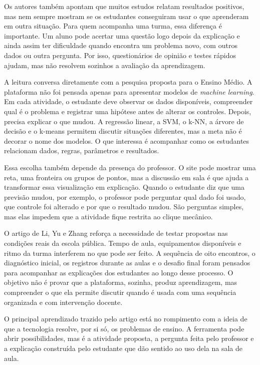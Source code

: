 \documentclass[12pt,a4paper]{article}
\begin{document}
Os autores também apontam que muitos estudos relatam resultados positivos, mas nem sempre mostram se os estudantes conseguiram usar o que aprenderam em outra situação. Para quem acompanha uma turma, essa diferença é importante. Um aluno pode acertar uma questão logo depois da explicação e ainda assim ter dificuldade quando encontra um problema novo, com outros dados ou outra pergunta. Por isso, questionários de opinião e testes rápidos ajudam, mas não resolvem sozinhos a avaliação da aprendizagem.

A leitura conversa diretamente com a pesquisa proposta para o Ensino Médio. A plataforma não foi pensada apenas para apresentar modelos de \textit{machine learning}. Em cada atividade, o estudante deve observar os dados disponíveis, compreender qual é o problema e registrar uma hipótese antes de alterar os controles. Depois, precisa explicar o que mudou. A regressão linear, a SVM, o k-NN, a árvore de decisão e o k-means permitem discutir situações diferentes, mas a meta não é decorar o nome dos modelos. O que interessa é acompanhar como os estudantes relacionam dados, regras, parâmetros e resultados.

Essa escolha também depende da presença do professor. O site pode mostrar uma reta, uma fronteira ou grupos de pontos, mas a discussão em sala é que ajuda a transformar essa visualização em explicação. Quando o estudante diz que uma previsão mudou, por exemplo, o professor pode perguntar qual dado foi usado, que controle foi alterado e por que o resultado mudou. São perguntas simples, mas elas impedem que a atividade fique restrita ao clique mecânico.

O artigo de Li, Yu e Zhang reforça a necessidade de testar propostas nas condições reais da escola pública. Tempo de aula, equipamentos disponíveis e ritmo da turma interferem no que pode ser feito. A sequência de oito encontros, o diagnóstico inicial, os registros durante as aulas e o desafio final foram pensados para acompanhar as explicações dos estudantes ao longo desse processo. O objetivo não é provar que a plataforma, sozinha, produz aprendizagem, mas compreender o que ela permite discutir quando é usada com uma sequência organizada e com intervenção docente.

O principal aprendizado trazido pelo artigo está no rompimento com a ideia de que a tecnologia resolve, por si só, os problemas de ensino. A ferramenta pode abrir possibilidades, mas é a atividade proposta, a pergunta feita pelo professor e a explicação construída pelo estudante que dão sentido ao uso dela na sala de aula.
\end{document}
